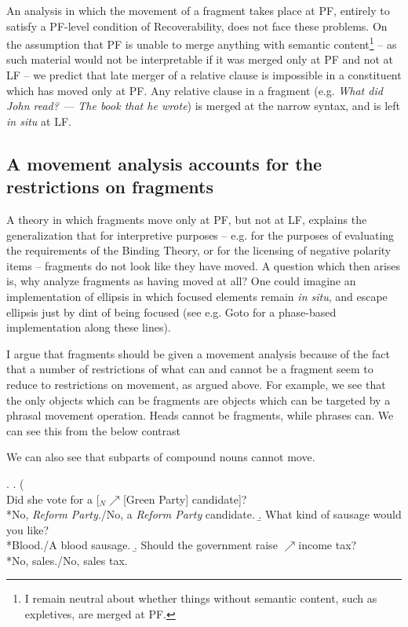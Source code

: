 \documentclass[11pt,letterpaper]{article}
\begin{document}
 An analysis in which the movement of a fragment takes place at PF, entirely to satisfy a PF-level condition of Recoverability, does not face these problems.
 On the assumption that PF is unable to merge anything with semantic content\footnote{I remain neutral about whether things without semantic content, such as expletives, are merged at PF.} -- as such material would not be interpretable if it was merged only at PF and not at LF -- we predict that late merger of a relative clause is impossible in a constituent which has moved only at PF.
 Any relative clause in a fragment (e.g. {\it What did John read? --- The book that he wrote}) is merged at the narrow syntax, and is left {\it in situ} at LF.
 
 
 \subsection{A movement analysis accounts for the restrictions on fragments}
 
 A theory in which fragments move only at PF, but not at LF, explains the generalization that for interpretive purposes -- e.g. for the purposes of evaluating the requirements of the Binding Theory, or for the licensing of negative polarity items -- fragments do not look like they have moved.
 A question which then arises is, why analyze fragments as having moved at all?
 One could imagine an implementation of ellipsis in which focused elements remain {\it in situ}, and escape ellipsis just by dint of being focused (see e.g. Goto %
 for a phase-based implementation along these lines).
 
 I argue that fragments should be given a movement analysis because of the fact that a number of restrictions of what can and cannot be a fragment seem to reduce to restrictions on movement, as argued above.
 For example, we see that the only objects which can be fragments are objects which can be targeted by a phrasal movement operation.
 Heads cannot be fragments, while phrases can.
 We can see this from the below contrast %
 
 We can also see that subparts of compound nouns cannot move.
 
 \ex.	\a.	( \\ %
 		Did she vote for a [$_N \nearrow$[Green Party] candidate]?\\
 		{}*No, {\it Reform Party}./No, a {\it Reform Party} candidate.
 			\b. What kind of sausage would you like?\\
 				{}*Blood./A blood sausage.
 			\b. Should the government raise $\nearrow$income tax?\\
 				{}*No, sales./No, sales tax.
 	
\end{document}
